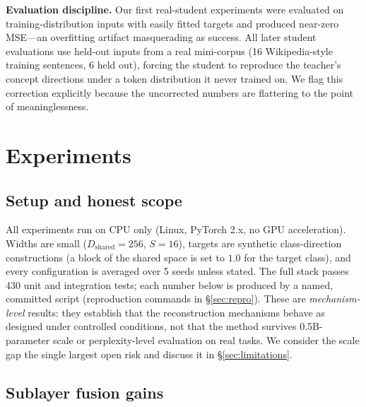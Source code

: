 \documentclass[10pt,twoside]{article}
\theoremstyle{definition}
\begin{document}
\textbf{Evaluation discipline.} Our first real-student experiments were evaluated on training-distribution inputs with easily fitted targets and produced near-zero MSE---an overfitting artifact masquerading as success. All later student evaluations use held-out inputs from a real mini-corpus (16 Wikipedia-style training sentences, 6 held out), forcing the student to reproduce the teacher's concept directions under a token distribution it never trained on. We flag this correction explicitly because the uncorrected numbers are flattering to the point of meaninglessness.

\section{Experiments}
\label{sec:exp}

\subsection{Setup and honest scope}
\label{sec:exp-setup}

All experiments run on CPU only (Linux, PyTorch 2.x, no GPU acceleration). Widths are small ($D_{\text{shared}}{=}256$, $S{=}16$), targets are synthetic class-direction constructions (a block of the shared space is set to $1.0$ for the target class), and every configuration is averaged over 5 seeds unless stated. The full stack passes 430 unit and integration tests; each number below is produced by a named, committed script (reproduction commands in \S\ref{sec:repro}). These are \emph{mechanism-level} results: they establish that the reconstruction mechanisms behave as designed under controlled conditions, not that the method survives 0.5B-parameter scale or perplexity-level evaluation on real tasks. We consider the scale gap the single largest open risk and discuss it in \S\ref{sec:limitations}.

\subsection{Sublayer fusion gains}
\label{sec:fusion-exp}
\end{document}
